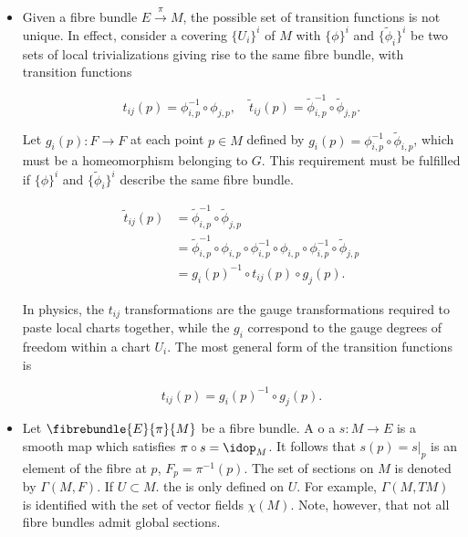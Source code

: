 \begin{remark}
\end{remark}

\begin{itemize}
    \item Given a fibre bundle $E \overset{\pi}{\rightarrow} M$, the possible set of transition functions is not unique. 
        In effect, consider a covering $\{U_i\}^i$ of $M$ with $\{\phi\}^i$ and $\{\tilde{\phi}_i\}^i$ be two sets of local trivializations giving rise to the same fibre bundle, with transition functions 

        \begin{equation}
            t_{ij}(p) = \phi_{i,p}^{-1} \circ \phi_{j,p}, \quad \tilde{t}_{ij}(p) = \tilde{\phi}_{i,p}^{-1} \circ \tilde{\phi}_{j,p}.
        \end{equation}

        Let $g_i(p) : F \rightarrow F$ at each point $p \in M$ defined by $g_i(p) = \phi^{-1}_{i,p} \circ \tilde{\phi}_{i,p}$, which must be a homeomorphism belonging to $G$. 
        This requirement must be fulfilled if $\{\phi\}^i$ and $\{\tilde{\phi}_i\}^i$ describe the same fibre bundle.

        \begin{equation}
        \begin{split}
            \tilde{t}_{ij}(p) &= \tilde{\phi}_{i,p}^{-1} \circ \tilde{\phi}_{j,p} \\
            &= \tilde{\phi}_{i,p}^{-1} \circ {\phi}_{i,p} \circ {\phi}^{-1}_{i,p} \circ {\phi}_{i,p} \circ {\phi}^{-1}_{i,p}  \circ \tilde{\phi}_{j,p} \\
            &= g_i(p)^{-1} \circ t_{ij}(p) \circ g_{j}(p). 
        \end{split}
        \end{equation}

    In physics, the $t_{ij}$ transformations are the gauge transformations required to paste local charts together, while the $g_i$ correspond       
    to the gauge degrees of freedom within a chart $U_i$. The most general form of the transition functions is 

    \begin{equation}
        t_{ij}(p) = g_i(p)^{-1} \circ g_j(p).
    \end{equation}
    
\end{itemize}

\begin{remark}
\end{remark}
\begin{itemize}
    \item Let $\fibrebundle{E}{\pi}{M}$ be a fibre bundle. A  o a  $s : M \rightarrow E$ is a smooth map which satisfies $\pi \circ s = \idop_M$. It follows that $s(p) = s|_p$ is an element of the fibre at $p$, $F_p = \pi^{-1}(p)$.
    The set of sections on $M$ is denoted by $\Gamma(M,F)$. If $U \subset M$. the  is only defined on $U$. For example, $\Gamma(M, TM)$ is identified with the set of vector fields $\chi(M)$.
    Note, however, that not all fibre bundles admit global sections.
\end{itemize} \bigbreak

